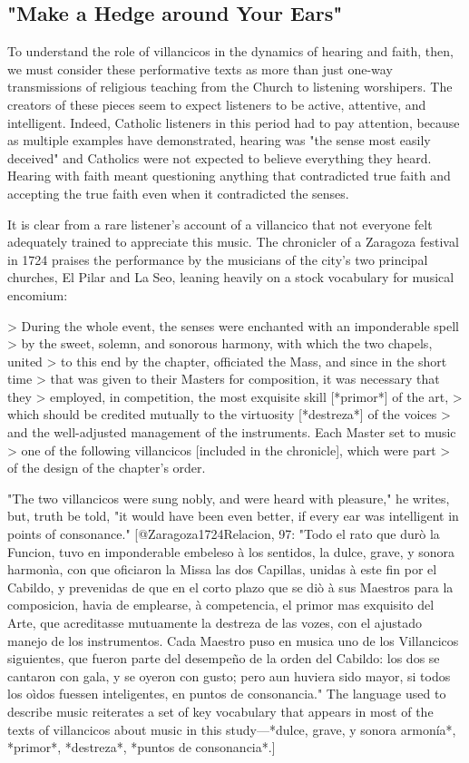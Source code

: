 \subsection{"Make a Hedge around Your Ears"}

To understand the role of villancicos in the dynamics of hearing and faith,
then, we must consider these performative texts as more than just one-way
transmissions of religious teaching from the Church to listening worshipers. 
The creators of these pieces seem to expect listeners to be active, attentive,
and intelligent. 
Indeed, Catholic listeners in this period had to pay attention, because as
multiple examples have demonstrated, hearing was "the sense most easily
deceived" and Catholics were not expected to believe everything they heard.
Hearing with faith meant questioning anything that contradicted true faith and
accepting the true faith even when it contradicted the senses. 

It is clear from a rare listener's account of a villancico that not everyone
felt adequately trained to appreciate this music.
The chronicler of a Zaragoza festival in 1724 praises the performance by the
musicians of the city's two principal churches, El Pilar and La Seo, leaning
heavily on a stock vocabulary for musical encomium: 

> During the whole event, the senses were enchanted with an imponderable spell
> by the sweet, solemn, and sonorous harmony, with which the two chapels, united
> to this end by the chapter, officiated the Mass, and since in the short time
> that was given to their Masters for composition, it was necessary that they
> employed, in competition, the most exquisite skill [*primor*] of the art,
> which should be credited mutually to the virtuosity [*destreza*] of the voices
> and the well-adjusted management of the instruments.  Each Master set to music
> one of the following villancicos [included in the chronicle], which were part
> of the design of the chapter's order.

"The two villancicos were sung nobly, and were heard with pleasure," he writes,
but, truth be told, "it would have been even better, if every ear was
intelligent in points of consonance."
[@Zaragoza1724Relacion, 97: 
"Todo el rato que durò la Funcion, tuvo en imponderable embeleso à los sentidos,
la dulce, grave, y sonora harmonìa, con que oficiaron la Missa las dos Capillas,
unidas à este fin por el Cabildo, y prevenidas de que en el corto plazo que se
diò à sus Maestros para la composicion, havia de emplearse, à competencia, el
primor mas exquisito del Arte, que acreditasse mutuamente la destreza de las
vozes, con el ajustado manejo de los instrumentos.
Cada Maestro puso en musica uno de los Villancicos siguientes, que fueron parte
del desempeño de la orden del Cabildo: los dos se cantaron con gala, y se oyeron
con gusto; pero aun huviera sido mayor, si todos los oìdos fuessen inteligentes,
en puntos de consonancia." 
The language used to describe music reiterates a set of key vocabulary that
appears in most of the texts of villancicos about music in this study---*dulce,
grave, y sonora armonía*, *primor*, *destreza*, *puntos de consonancia*.]

